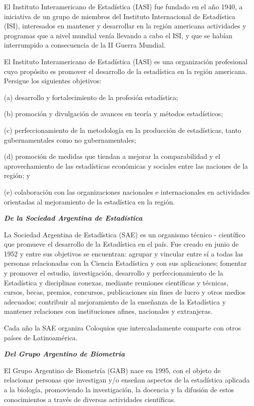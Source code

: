 \documentclass[12pt,twoside,a4paper]{article}
\begin{document}
El Instituto Interamericano de Estadística (IASI) fue fundado en el año 1940, a iniciativa de un grupo de miembros del Instituto Internacional de Estadística (ISI), interesados en mantener y desarrollar en la región americana actividades y programas que a nivel mundial venía llevando a cabo el ISI, y que se habían interrumpido a consecuencia de la II Guerra Mundial.

El Instituto Interamericano de Estadística (IASI) es una organización profesional cuyo propósito es promover el desarrollo de la estadística en la región americana.  Persigue los siguientes objetivos: 

(a) desarrollo y fortalecimiento de la profesión estadística;

(b) promoción y divulgación de avances en teoría y métodos estadísticos;

(c) perfeccionamiento de la metodología en la producción de estadísticas, tanto gubernamentales como no gubernamentales;

(d) promoción de medidas que tiendan a mejorar la comparabilidad y el aprovechamiento de las estadísticas económicas y sociales entre las naciones de la región; y

(e) colaboración con las organizaciones nacionales e internacionales en actividades orientadas al mejoramiento de la estadística en la región.

\bigskip

\bigbreak
\noindent\textbf{\textit{De la Sociedad Argentina de Estadística}}

La Sociedad Argentina de Estadística (SAE) es un organismo técnico - científico que promueve el desarrollo de la Estadística en el país. Fue creado en junio de 1952 y entre sus objetivos se encuentran: agrupar y vincular entre sí a todas las personas relacionadas con la Ciencia Estadística y con sus aplicaciones; fomentar y promover el estudio, investigación, desarrollo y perfeccionamiento de la Estadística y disciplinas conexas, mediante reuniones científicas y técnicas, cursos, becas, premios, concursos, publicaciones sin fines de lucro y otros medios adecuados; contribuir al mejoramiento de la enseñanza de la Estadística y mantener relaciones con instituciones afines, nacionales y extranjeras.

Cada año la SAE organiza Coloquios que intercaladamente comparte con otros países de Latinoamérica.

\bigbreak
\noindent\textbf{\textit{Del Grupo Argentino de Biometría}}

El Grupo Argentino de Biometría (GAB) nace en 1995, con el objeto de relacionar personas que investigan y/o enseñan aspectos de la estadística aplicada a la biología, promoviendo la investigación, la docencia y la difusión de estos conocimientos a través de diversas actividades científicas.
\end{document}
